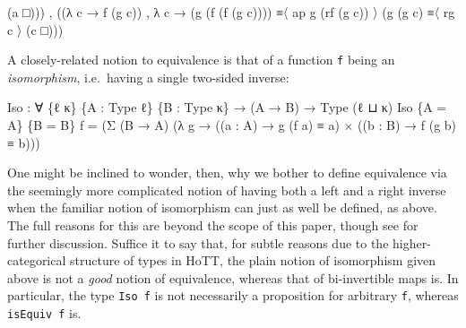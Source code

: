 \documentclass[
  11pt,
  oneside,
  article]{memoir}
\newenvironment{Shaded}{}{}
\newcommand{\NormalTok}[1]{#1}
\newcommand{\OtherTok}[1]{\textcolor[rgb]{0.00,0.44,0.13}{#1}}
\theoremstyle{definition}
\theoremstyle{plain}
\newcommand{\0}{\textsf{0}}
\newcommand{\1}{\tn{\textsf{1}}}
\begin{document}
\begin{Shaded}
\begin{Highlighting}[]
              \OtherTok{(}\NormalTok{a                    □}\OtherTok{)))} 
\NormalTok{    , }\OtherTok{((λ}\NormalTok{ c }\OtherTok{→}\NormalTok{ f\textquotesingle{}\textquotesingle{} }\OtherTok{(}\NormalTok{g\textquotesingle{}\textquotesingle{} c}\OtherTok{))} 
\NormalTok{      , }\OtherTok{λ}\NormalTok{ c }\OtherTok{→} \OtherTok{(}\NormalTok{g }\OtherTok{(}\NormalTok{f }\OtherTok{(}\NormalTok{f\textquotesingle{}\textquotesingle{} }\OtherTok{(}\NormalTok{g\textquotesingle{}\textquotesingle{} c}\OtherTok{))))}\NormalTok{ ≡〈 ap g  }\OtherTok{(}\NormalTok{rf }\OtherTok{(}\NormalTok{g\textquotesingle{}\textquotesingle{} c}\OtherTok{))}\NormalTok{ 〉 }
              \OtherTok{(}\NormalTok{g }\OtherTok{(}\NormalTok{g\textquotesingle{}\textquotesingle{} c}\OtherTok{)}\NormalTok{            ≡〈 rg c 〉}
              \OtherTok{(}\NormalTok{c                    □}\OtherTok{)))}
\end{Highlighting}
\end{Shaded}

A closely-related notion to equivalence is that of a function \texttt{f}
being an \emph{isomorphism}, i.e.~having a single two-sided inverse:

\begin{Shaded}
\begin{Highlighting}[]
\NormalTok{Iso }\OtherTok{:} \OtherTok{∀} \OtherTok{\{}\NormalTok{ℓ κ}\OtherTok{\}} \OtherTok{\{}\NormalTok{A }\OtherTok{:}\NormalTok{ Type ℓ}\OtherTok{\}} \OtherTok{\{}\NormalTok{B }\OtherTok{:}\NormalTok{ Type κ}\OtherTok{\}} \OtherTok{→} \OtherTok{(}\NormalTok{A }\OtherTok{→}\NormalTok{ B}\OtherTok{)} \OtherTok{→}\NormalTok{ Type }\OtherTok{(}\NormalTok{ℓ ⊔ κ}\OtherTok{)}
\NormalTok{Iso }\OtherTok{\{}\NormalTok{A }\OtherTok{=}\NormalTok{ A}\OtherTok{\}} \OtherTok{\{}\NormalTok{B }\OtherTok{=}\NormalTok{ B}\OtherTok{\}}\NormalTok{ f }\OtherTok{=} 
    \OtherTok{(}\NormalTok{Σ }\OtherTok{(}\NormalTok{B }\OtherTok{→}\NormalTok{ A}\OtherTok{)} \OtherTok{(λ}\NormalTok{ g }\OtherTok{→} \OtherTok{((}\NormalTok{a }\OtherTok{:}\NormalTok{ A}\OtherTok{)} \OtherTok{→}\NormalTok{ g }\OtherTok{(}\NormalTok{f a}\OtherTok{)}\NormalTok{ ≡ a}\OtherTok{)} 
\NormalTok{                    × }\OtherTok{((}\NormalTok{b }\OtherTok{:}\NormalTok{ B}\OtherTok{)} \OtherTok{→}\NormalTok{ f }\OtherTok{(}\NormalTok{g b}\OtherTok{)}\NormalTok{ ≡ b}\OtherTok{)))}
\end{Highlighting}
\end{Shaded}

One might be inclined to wonder, then, why we bother to define
equivalence via the seemingly more complicated notion of having both a
left and a right inverse when the familiar notion of isomorphism can
just as well be defined, as above. The full reasons for this are beyond
the scope of this paper, though see \cite{hottbook} for further
discussion. Suffice it to say that, for subtle reasons due to the
higher-categorical structure of types in HoTT, the plain notion of
isomorphism given above is not a \emph{good} notion of equivalence,
whereas that of bi-invertible maps is. In particular, the type
\texttt{Iso\ f} is not necessarily a proposition for arbitrary
\texttt{f}, whereas \texttt{isEquiv\ f} is.
\end{document}
